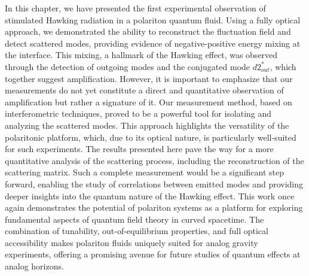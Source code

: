 In this chapter, we have presented the first experimental observation of stimulated Hawking radiation in a polariton quantum fluid. Using a fully optical approach, we demonstrated the ability to reconstruct the fluctuation field and detect scattered modes, providing evidence of negative-positive energy mixing at the interface.
 This mixing, a hallmark of the Hawking effect, was observed through the detection of outgoing modes and the conjugated mode \(d2_{out}^*\), which together suggest amplification.
 However, it is important to emphasize that our measurements do not yet constitute a direct and quantitative observation of amplification but rather a signature of it.
Our measurement method, based on interferometric techniques, proved to be a powerful tool for isolating and analyzing the scattered modes. This approach highlights the versatility of the polaritonic platform, which, due to its optical nature, is particularly well-suited for such experiments. 
The results presented here pave the way for a more quantitative analysis of the scattering process, including the reconstruction of the scattering matrix. Such a complete measurement would be a significant step forward, enabling the study of correlations between emitted modes and providing deeper insights into the quantum nature of the Hawking effect.
This work once again demonstrates the potential of polariton systems as a platform for exploring fundamental aspects of quantum field theory in curved spacetime. The combination of tunability, out-of-equilibrium properties, and full optical accessibility makes polariton fluids uniquely suited for analog gravity experiments, offering a promising avenue for future studies of quantum effects at analog horizons.